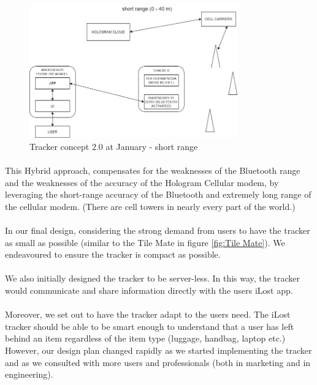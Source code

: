 \documentclass[12pt,a4paper]{article}
\begin{document}
        \begin{figure}[H]
          \centering
          \includegraphics[width=0.8\textwidth]{../assets/design-concept-v20-short-range.jpg}
          \caption{Tracker concept 2.0 at January - short range}
          \label{fig:Tracker concept at January - short range}
        \end{figure}
        
        \paragraph{} This Hybrid approach, compensates for the weaknesses of the Bluetooth range and the weaknesses of the accuracy of the Hologram Cellular modem, by leveraging the short-range accuracy of the Bluetooth and extremely long range of the cellular modem. (There are cell towers in nearly every part of the world.)
        
        \paragraph{} In our final design, considering the strong demand from users to have the tracker as small as possible (similar to the Tile Mate in figure \ref{fig:Tile Mate}). We endeavoured to ensure the tracker is compact as possible.
        
        \paragraph{} We also initially designed the tracker to be server-less. In this way, the tracker would communicate and share information directly with the users iLost app.
        
        \paragraph{} Moreover, we set out to have the tracker adapt to the users need. The iLost tracker should be able to be smart enough to understand that a user has left behind an item regardless of the item type (luggage, handbag, laptop etc.) However, our design plan changed rapidly as we started implementing the tracker and as we consulted with more users and professionals (both in marketing and in engineering).
        
\end{document}
